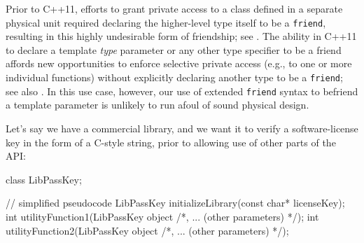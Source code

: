 Prior to C++11,
efforts to grant private access to a class defined in a separate
physical unit required declaring the higher-level type itself to be a
\lstinline!friend!, resulting in this highly undesirable form of
friendship; see .
The ability in C++11 to
declare a template \emph{type} parameter or any other type specifier to
be a friend affords new opportunities to enforce selective
private access (e.g., to one or more individual functions) without
explicitly declaring another type to be a \lstinline!friend!; see also .
In this use case, however, our use of extended
\lstinline!friend! syntax to befriend a template parameter is unlikely to run
afoul of sound physical design.

Let's say we have a commercial library, and we want it to verify a
software-license key in the form of a C-style string, prior to allowing use of
other parts of the API:


\begin{emcppshiddenlisting}[emcppsbatch=e2]
class LibPassKey;
\end{emcppshiddenlisting}
\begin{emcppslisting}[emcppsbatch=e2]
// simplified pseudocode
LibPassKey initializeLibrary(const char* licenseKey);
int utilityFunction1(LibPassKey object /*, ... (other parameters) */);
int utilityFunction2(LibPassKey object /*, ... (other parameters) */);
\end{emcppslisting}

